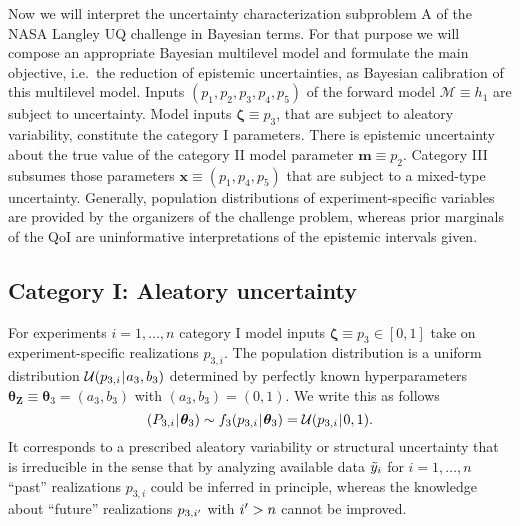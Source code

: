 Now we will interpret the uncertainty characterization subproblem A of the NASA Langley UQ challenge \cite{NASA:Crespo2014:Proc,NASA:Crespo2013:FAQ:URL} in Bayesian terms.
For that purpose we will compose an appropriate Bayesian multilevel model and formulate the main objective, i.e.\ the reduction of epistemic uncertainties, as Bayesian calibration of this multilevel model.
Inputs \((p_1,p_2,p_3,p_4,p_5)\) of the forward model \(\mathcal{M} \equiv h_1\) are subject to uncertainty.
Model inputs \(\bm{\zeta} \equiv p_3\), that are subject to aleatory variability, constitute the category I parameters.
There is epistemic uncertainty about the true value of the category II model parameter \(\bm{m} \equiv p_2\).
Category III subsumes those parameters \(\bm{x} \equiv (p_1,p_4,p_5)\) that are subject to a mixed-type uncertainty.
Generally, population distributions of experiment-specific variables are provided by the organizers of the challenge problem,
whereas prior marginals of the QoI are uninformative interpretations of the epistemic intervals given.

\subsection{Category I: Aleatory uncertainty}
For experiments \(i=1,\ldots,n\) category I model inputs \(\bm{\zeta} \equiv p_3 \in [0,1]\) take on experiment-specific realizations \(p_{3,i}\).
The population distribution is a uniform distribution \(\mathcal{U}(p_{3,i} {\:\!}|{\:\!} a_3,b_3)\) determined by perfectly known hyperparameters \(\bm{\theta}_{\bm{Z}} \equiv \bm{\theta}_3 = (a_3,b_3)\) with \((a_3,b_3) = (0,1)\).
We write this as follows
\begin{equation} \label{eq:JAIS:Distr:p3}
  (P_{3,i} {\:\!}|{\:\!} \bm{\theta}_3) \sim f_3(p_{3,i} {\:\!}|{\:\!} \bm{\theta}_3) = \mathcal{U}(p_{3,i} {\:\!}|{\:\!} 0,1).
\end{equation}
It corresponds to a prescribed aleatory variability or structural uncertainty that is irreducible in the sense that
by analyzing available data \(\tilde{y}_i\) for \(i=1,\ldots,n\) ``past'' realizations \(p_{3,i}\) could be inferred in principle,
whereas the knowledge about ``future'' realizations \(p_{3,{i}^\prime}\) with \({i}^\prime>n\) cannot be improved.

